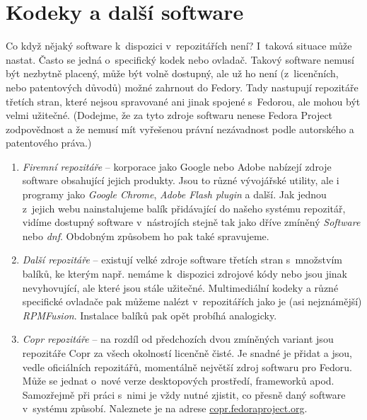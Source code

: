 \section*{Kodeky a další software}
Co když nějaký software k~dispozici v~repozitářích není? I~taková situace může nastat. Často se jedná o~specifický kodek nebo ovladač. Takový software nemusí být nezbytně placený, může být volně dostupný, ale už ho není (z~licenčních, nebo patentových důvodů) možné zahrnout do Fedory. Tady nastupují repozitáře třetích stran, které nejsou spravované ani jinak spojené s~Fedorou, ale mohou být velmi užitečné. (Dodejme, že za tyto zdroje softwaru nenese Fedora Project zodpovědnost a že nemusí mít vyřešenou právní nezávadnost podle autorského a patentového práva.)

\begin{enumerate}
\item \emph{Firemní repozitáře} -- korporace jako Google nebo Adobe nabízejí zdroje software obsahující jejich produkty. Jsou to různé vývojářské utility, ale i programy jako \emph{Google Chrome}, \emph{Adobe Flash plugin} a další. Jak jednou z~jejich webu nainstalujeme balík přidávající do našeho systému repozitář, vidíme dostupný software v~nástrojích stejně tak jako dříve zmíněný \emph{Software} nebo \emph{dnf}. Obdobným způsobem ho pak také spravujeme.

\item \emph{Další repozitáře} -- existují velké zdroje software třetích stran s~množstvím balíků, ke kterým např. nemáme k~dispozici zdrojové kódy nebo jsou jinak nevyhovující, ale které jsou stále užitečné. Multimediální kodeky a různé specifické ovladače pak můžeme nalézt v~repozitářích jako je (asi nejznámější) \emph{RPMFusion}. Instalace balíků pak opět probíhá analogicky.

\item \emph{Copr repozitáře} -- na rozdíl od předchozích dvou zmíněných variant jsou repozitáře Copr za všech okolností licenčně čisté. Je snadné je přidat a jsou, vedle oficiálních repozitářů, momentálně největší zdroj softwaru pro Fedoru. Může se jednat o~nové verze desktopových prostředí, frameworků apod. Samozřejmě při práci s~nimi je vždy nutné zjistit, co přesně daný software v~systému způsobí. Naleznete je na adrese \url{copr.fedoraproject.org}.

\end{enumerate}
